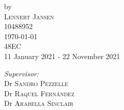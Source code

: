 \documentclass{report}
\begin{document}
{\begin{titlepage}




by\\[0.2cm]

\textsc{\Large Lennert Jansen}\\[0.2cm] %

10488952\\[1cm]










{\Large \today}\\[1cm] %



48EC\\ %

11 January 2021 - 22 November 2021\\[1cm]%






\begin{minipage}[t]{0.4\textwidth}

\begin{flushleft} \large

\emph{Supervisor:} \\

Dr \textsc{Sandro Pezzelle} \\ Dr \textsc{Raquel Fernández} \\ Dr \textsc{Arabella Sinclair}%

\end{flushleft}

\end{minipage}

~

\begin{minipage}[t]{0.4\textwidth}


\end{minipage}
\end{titlepage}}
\end{document}
